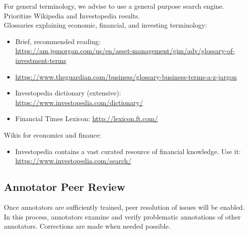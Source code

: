 For general terminology, we advise to use a general purpose search engine.
Prioritize Wikipedia and Investopedia results.\\

\noindent
Glossaries explaining economic, financial, and investing terminology:
\begin{itemize}[noitemsep, leftmargin=*]
    \item Brief, recommended reading:\\ \url{https://am.jpmorgan.com/us/en/asset-management/gim/adv/glossary-of-investment-terms}
    \item \url{https://www.theguardian.com/business/glossary-business-terms-a-z-jargon}
    \item Investopedia dictionary (extensive): \url{https://www.investopedia.com/dictionary/}
    \item Financial Times Lexicon: \url{http://lexicon.ft.com/}
\end{itemize}

\noindent
Wikis for economics and finance:
\begin{itemize}[noitemsep, leftmargin=*]
    \item Investopedia contains a vast curated resource of financial knowledge. Use it:\\
    \url{https://www.investopedia.com/search/}
\end{itemize}

\subsection{Annotator Peer Review}
Once annotators are sufficiently trained, peer resolution of issues will be enabled.
In this process, annotators examine and verify problematic annotations of other annotators.
Corrections are made when needed possible.